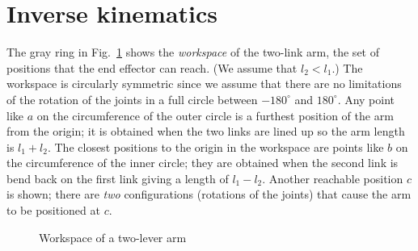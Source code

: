 \section{Inverse kinematics}\label{s.inverse-kinematics}

The gray ring in Fig.~\ref{fig.workspace} shows the \emph{workspace} of the two-link arm, the set of positions that the end effector can reach. (We assume that $l_2<l_1$.) The workspace is circularly symmetric since we assume that there are no limitations of the rotation of the joints in a full circle between $-180^{\circ}$ and $180^{\circ}$. Any point like $a$ on the circumference of the outer circle is a furthest position of the arm from the origin; it is obtained when the two links are lined up so the arm length is $l_1+l_2$. The closest positions to the origin in the workspace are points like $b$ on the circumference of the inner circle; they are obtained when the second link is bend back on the first link giving a length of $l_1-l_2$. Another reachable position $c$ is shown; there are \emph{two} configurations (rotations of the joints) that cause the arm to be positioned at $c$.

\begin{figure}
\begin{center}
\end{center}
\caption{Workspace of a two-lever arm}\label{fig.workspace}
\end{figure}

